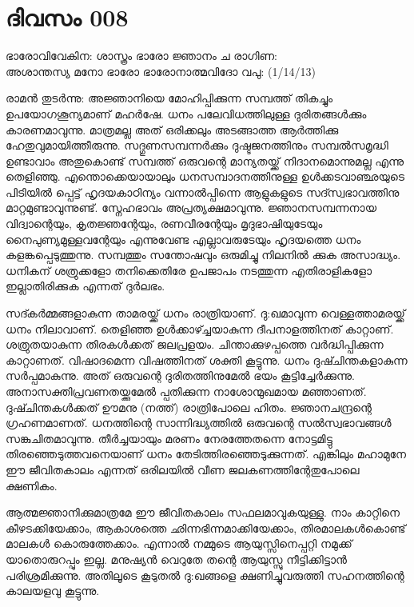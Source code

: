  
\section{ദിവസം 008}

\begin{center}
ഭാരോവിവേകിന: ശാസ്ത്രം ഭാരോ ജ്ഞാനം ച രാഗിണ:\\
അശാന്തസ്യ മനോ ഭാരോ ഭാരോനാത്മവിദോ വപു:  (1/14/13)\\
\end{center}


രാമന്‍ തുടര്‍ന്നു: അജ്ഞാനിയെ മോഹിപ്പിക്കുന്ന സമ്പത്ത്‌ തികച്ചും ഉപയോഗശൂന്യമാണ്‌ മഹര്‍ഷേ. ധനം പലേവിധത്തിലുള്ള ദുരിതങ്ങള്‍ക്കും കാരണമാവുന്നു. മാത്രമല്ല അത്‌ ഒരിക്കലും അടങ്ങാത്ത ആര്‍ത്തിക്കു ഹേതുവുമായിത്തീരുന്നു. സദ്ഗുണസമ്പന്നര്‍ക്കും ദുഷ്ടജനത്തിനും സമ്പല്‍സമൃദ്ധി ഉണ്ടാവാം അതുകൊണ്ട്‌ സമ്പത്ത്‌ ഒരുവന്റെ മാന്യതയ്ക്ക്‌ നിദാനമൊന്നുമല്ല എന്നു തെളിഞ്ഞു. എന്തൊക്കെയായാലും ധനസമ്പാദനത്തിനുള്ള ഉള്‍ക്കടവാഞ്ഛയുടെ പിടിയില്‍ പ്പെട്ട്‌ ഹൃദയകാഠിന്യം വന്നാല്‍പ്പിന്നെ ആളുകളുടെ സദ്സ്വഭാവത്തിനു മാറ്റമുണ്ടാവുന്നുണ്ട്‌. സ്നേഹഭാവം അപ്രത്യക്ഷമാവുന്നു. ജ്ഞാനസമ്പന്നനായ വിദ്വാന്റെയും, കൃതജ്ഞന്റേയും, രണവീരന്റേയും മൃദുഭാഷിയുടേയും നൈപുണ്യമുള്ളവന്റേയും എന്നുവേണ്ട എല്ലാവരുടേയും ഹൃദയത്തെ ധനം കളങ്കപ്പെടുത്തുന്നു. സമ്പത്തും സന്തോഷവും ഒരുമിച്ചു നിലനില്‍ ക്കുക അസാദ്ധ്യം. ധനികന്‌ ശത്രുക്കളോ തനിക്കെതിരേ ഉപജാപം നടത്തുന്ന എതിരാളികളോ ഇല്ലാതിരിക്കുക എന്നത്‌ ദുര്‍ലഭം. 

സദ്കര്‍മ്മങ്ങളാകുന്ന താമരയ്ക്ക്‌ ധനം രാത്രിയാണ്‌. ദു:ഖമാവുന്ന വെള്ളത്താമരയ്ക്ക്‌ ധനം നിലാവാണ്‌. തെളിഞ്ഞ ഉള്‍ക്കാഴ്ച്ചയാകുന്ന ദീപനാളത്തിനത്‌ കാറ്റാണ്‌. ശത്രുതയാകുന്ന തിരകള്‍ക്കത്‌ ജലപ്രളയം. ചിന്താക്കുഴപ്പത്തെ വര്‍ദ്ധിപ്പിക്കുന്ന കാറ്റാണത്‌. വിഷാദമെന്ന വിഷത്തിനത്‌ ശക്തി കൂട്ടുന്നു. ധനം ദുഷ്ചിന്തകളാകുന്ന സര്‍പ്പമാകുന്നു. അത്‌ ഒരുവന്റെ ദുരിതത്തിനുമേല്‍ ഭയം കൂട്ടിച്ചേര്‍ക്കുന്നു. അനാസക്തിപ്രവണതയ്ക്കുമേല്‍ പ്പതിക്കുന്ന നാശോന്മുഖമായ മഞ്ഞാണത്‌. ദുഷ്ചിന്തകള്‍ക്കത്‌ ഊമനു (നത്ത്‌) രാത്രിപോലെ ഹിതം. ജ്ഞാനചന്ദ്രന്റെ ഗ്രഹണമാണത്‌. ധനത്തിന്റെ സാന്നിദ്ധ്യത്തില്‍ ഒരുവന്റെ സല്‍സ്വഭാവങ്ങള്‍ സങ്കുചിതമാവുന്നു. തീര്‍ച്ചയായും മരണം നേരത്തേതന്നെ നോട്ടമിട്ടു തിരഞ്ഞെടുത്തവനെയാണ്‌ ധനം തേടിത്തിരഞ്ഞെടുക്കുന്നത്‌. എങ്കിലും മഹാമുനേ ഈ ജീവിതകാലം എന്നത്‌ ഒരിലയില്‍ വീണ ജലകണത്തിന്റേതുപോലെ ക്ഷണികം. 


ആത്മജ്ഞാനിക്കുമാത്രമേ ഈ ജീവിതകാലം സഫലമാവുകയുള്ളു. നാം കാറ്റിനെ കീഴടക്കിയേക്കാം, ആകാശത്തെ ഛിന്നഭിന്നമാക്കിയേക്കാം, തിരമാലകള്‍കൊണ്ട്‌ മാലകള്‍ കൊരുത്തേക്കാം. എന്നാല്‍ നമ്മുടെ ആയുസ്സിനെപ്പറ്റി നമുക്ക്‌ യാതൊരുറപ്പും ഇല്ല. മനുഷ്യന്‍ വെറുതേ തന്റെ ആയുസ്സു നീട്ടിക്കിട്ടാന്‍ പരിശ്രമിക്കുന്നു. അതിലൂടെ കൂടുതല്‍ ദു:ഖങ്ങളെ ക്ഷണിച്ചുവരുത്തി സഹനത്തിന്റെ കാലയളവു കൂട്ടുന്നു.

